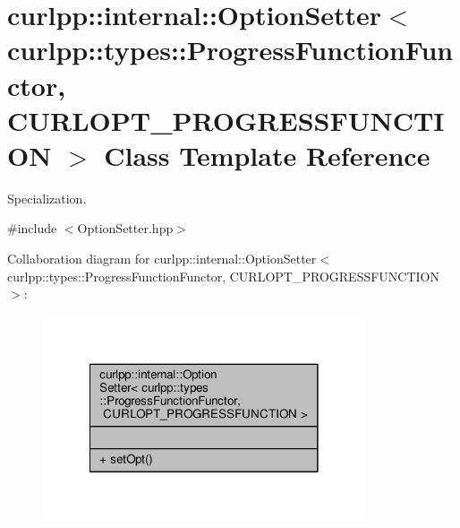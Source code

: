 \hypertarget{classcurlpp_1_1internal_1_1OptionSetter_3_01curlpp_1_1types_1_1ProgressFunctionFunctor_00_01CURLOPT__PROGRESSFUNCTION_01_4}{\section{curlpp\-:\-:internal\-:\-:Option\-Setter$<$ curlpp\-:\-:types\-:\-:Progress\-Function\-Functor, C\-U\-R\-L\-O\-P\-T\-\_\-\-P\-R\-O\-G\-R\-E\-S\-S\-F\-U\-N\-C\-T\-I\-O\-N $>$ Class Template Reference}
\label{classcurlpp_1_1internal_1_1OptionSetter_3_01curlpp_1_1types_1_1ProgressFunctionFunctor_00_01CURLOPT__PROGRESSFUNCTION_01_4}
}


Specialization.  




{\ttfamily \#include $<$Option\-Setter.\-hpp$>$}



Collaboration diagram for curlpp\-:\-:internal\-:\-:Option\-Setter$<$ curlpp\-:\-:types\-:\-:Progress\-Function\-Functor, C\-U\-R\-L\-O\-P\-T\-\_\-\-P\-R\-O\-G\-R\-E\-S\-S\-F\-U\-N\-C\-T\-I\-O\-N $>$\-:
\nopagebreak
\begin{figure}[H]
\begin{center}
\leavevmode
\includegraphics[width=270pt]{classcurlpp_1_1internal_1_1OptionSetter_3_01curlpp_1_1types_1_1ProgressFunctionFunctor_00_01CURL7af8623290446774105a4dc739229c13}
\end{center}
\end{figure}

